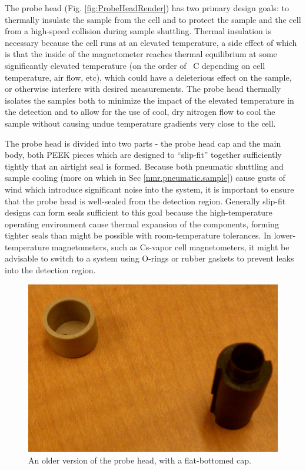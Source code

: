 \documentclass[PaulGanssle-Thesis.tex]{subfiles}
\begin{document}
The probe head (Fig. \ref{fig:ProbeHeadRender}) has two primary design goals: to thermally insulate the sample from the cell and to protect the sample and the cell from a high-speed collision during sample shuttling. Thermal insulation is necessary because the cell runs at an elevated temperature, a side effect of which is that the inside of the magnetometer reaches thermal equilibrium at some significantly elevated temperature (on the order of \unit[60-100]{\degsym C} depending on cell temperature, air flow, etc), which could have a deleterious effect on the sample, or otherwise interfere with desired measurements. The probe head thermally isolates the samples both to minimize the impact of the elevated temperature in the detection and to allow for the use of cool, dry nitrogen flow to cool the sample without causing undue temperature gradients very close to the cell.

The probe head is divided into two parts - the probe head cap and the main body, both PEEK pieces which are designed to ``slip-fit'' together sufficiently tightly that an airtight seal is formed. Because both pneumatic shuttling and sample cooling (more on which in Sec \ref{nmr.pneumatic.sample}) cause gusts of wind which introduce significant noise into the system, it is important to ensure that the probe head is well-sealed from the detection region.  Generally slip-fit designs can form seals sufficient to this goal because the high-temperature operating environment cause thermal expansion of the components, forming tighter seals than might be possible with room-temperature tolerances. In lower-temperature magnetometers, such as Cs-vapor cell magnetometers, it might be advisable to switch to a system using O-rings or rubber gaskets to prevent leaks into the detection region.

\begin{figure}
\includegraphics[width=0.4\tw]{figures/magnetometer/ProbeHeadOldCap-Smaller.png}
\caption{An older version of the probe head, with a flat-bottomed cap.}
\label{fig:OldProbeCap}
\vspace*{-0.5\lineheight}
\end{figure}
\end{document}
